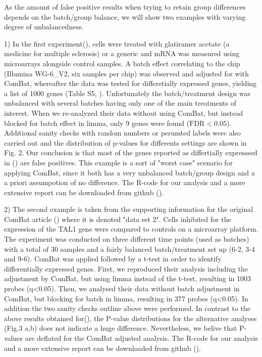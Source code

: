 \documentclass{bio}
\begin{document}
As the amount of false positive results when trying to retain group differences depends on the batch/group balance, we will show two examples with varying degree of unbalancedness. 

1) In the first experiment(\citealp{Towfic2014}), cells were treated with glatiramer acetate (a medicine for multiple sclerosis) or a generic and mRNA was measured using microarrays alongside control samples. A batch effect correlating to the chip (Illumina WG-6\_V2, six samples per chip) was observed and adjusted for with ComBat, whereafter the data was tested for differetially expressed genes, yielding a list of 1000 genes (Table S5, \citealp{Towfic2014}). Unfortunately the batch/treatment design was unbalanced with several batches having only one of the main treatments of interest. When we re-analyzed their data without using ComBat, but instead blocked for batch effect in limma, only 9 genes were found ($\text{FDR}<0.05$). Additional sanity checks with random numbers or perumted labels were also carried out and the distribution of p-values for differents settings are shown in Fig. 2.  Our conclusion is that most of the genes reported as differtially expresssed in (\citealp{Towfic2014}) are false positives. This example is a sort of "worst case" scenario for applying ComBat, since it both has a very unbalanced batch/group design and a a priori assumpotion of no difference. The R-code for our analysis and a more extensive report can be downloaded from github (\href{https://github.com/vegardny/combat_tests.git}).


2) The second example is taken from the supporting information for the original ComBat article (\citealp{Johnson2007}) where it is denoted "data set 2". Cells inhibited for the expression of the TAL1 gene were compared to controls on a microarray platform. The experiment was conducted on three different time points (used as batches) with a total of 30 samples and a fairly balanced batch/treatment set up (6-2, 3-4 and 9-6). ComBat was applied followed by a t-test in order to identify differentially expressed genes. First, we reproduced their analysis including the adjustment by ComBat, but using limma instead of the t-test, resulting in 1003 probes (q<0.05).  Then, we analysed their data without batch adjustment in ComBat, but blocking for batch in limma, resulting in 377 probes (q<0.05). In addition the two sanity checks outline above were performed. In contrast to the above results obtained for(\citealp{Towfic2014}), the P-value distributions for the alternative analyses (Fig.3 a,b) does not indicate a huge difference. Nevertheless, we belive that  P-values are deflated for the ComBat adjusted analysis. The R-code for our analysis and a more extensive report can be downloaded from github (\href{https://github.com/vegardny/combat_tests.git}).
\end{document}
